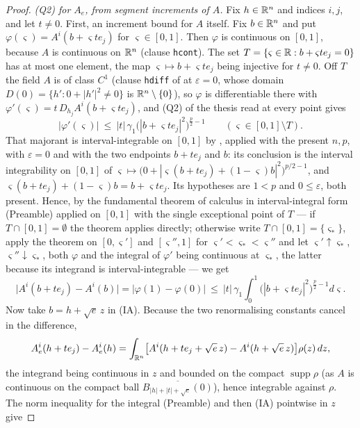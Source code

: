 \begin{proof}
\emph{\textup{(Q2)} for $A_e$, from segment increments of $A$.}  Fix
$h\in\mathbb{R}^n$ and indices $i,j$, and let $t\ne0$.  First, an increment bound for
$A$ itself.  Fix $b\in\mathbb{R}^n$ and put $\varphi(\varsigma)=A^i(b+\varsigma t e_j)$
for $\varsigma\in[0,1]$.  Then $\varphi$ is continuous on $[0,1]$, because $A$
is continuous on $\mathbb{R}^n$ (clause \texttt{hcont}).  The set
$T=\{\varsigma\in\mathbb{R}:b+\varsigma te_j=0\}$ has at most one element, the map
$\varsigma\mapsto b+\varsigma te_j$ being injective for $t\ne0$.  Off $T$ the
field $A$ is of class $C^1$ (clause \texttt{hdiff} of
 at $\varepsilon=0$, whose domain
$D(0)=\{h':0+|h'|^2\ne0\}$ is $\mathbb{R}^n\setminus\{0\}$), so $\varphi$ is
differentiable there with
$\varphi'(\varsigma)=t\,D_{h_j}A^i(b+\varsigma te_j)$, and (Q2) of the thesis read at
every point gives
\[
|\varphi'(\varsigma)|\ \le\ |t|\,\gamma_1\bigl(|b+\varsigma te_j|^2\bigr)^{\frac p2-1}
\qquad(\varsigma\in[0,1]\setminus T).
\]
That majorant is interval-integrable on $[0,1]$ by
, applied with the present $n,p$, with
$\varepsilon=0$ and with the two endpoints $b+te_j$ and $b$: its conclusion is
the interval integrability on $[0,1]$ of
$\varsigma\mapsto\bigl(0+|\varsigma(b+te_j)+(1-\varsigma)b|^2\bigr)^{p/2-1}$,
and $\varsigma(b+te_j)+(1-\varsigma)b=b+\varsigma te_j$.  Its hypotheses are
$1<p$ and $0\le\varepsilon$, both present.  Hence, by the fundamental theorem of
calculus in interval-integral form (Preamble) applied on $[0,1]$ with the single
exceptional point of $T$ --- if $T\cap[0,1]=\emptyset$ the theorem applies
directly; otherwise write $T\cap[0,1]=\{\varsigma_\ast\}$, apply the theorem on
$[0,\varsigma']$ and $[\varsigma'',1]$ for
$\varsigma'<\varsigma_\ast<\varsigma''$ and let
$\varsigma'\uparrow\varsigma_\ast$, $\varsigma''\downarrow\varsigma_\ast$, both
$\varphi$ and the integral of $\varphi'$ being continuous at $\varsigma_\ast$,
the latter because its integrand is interval-integrable --- we get
\[
\bigl|A^i(b+te_j)-A^i(b)\bigr|
=\bigl|\varphi(1)-\varphi(0)\bigr|
\ \le\ |t|\,\gamma_1\int_0^1\bigl(|b+\varsigma te_j|^2\bigr)^{\frac p2-1}d\varsigma .
\tag{IA}
\]
Now take $b=h+\sqrt e\,z$ in (IA).  Because the two renormalising constants
cancel in the difference,
\[
A_e^i(h+te_j)-A_e^i(h)
=\int_{\mathbb{R}^n}\bigl[A^i(h+te_j+\sqrt e\,z)-A^i(h+\sqrt e\,z)\bigr]\rho(z)\,dz ,
\]
the integrand being continuous in $z$ and bounded on the compact
$\operatorname{supp}\rho$ (as $A$ is continuous on the compact ball
$\overline{B_{|h|+|t|+\sqrt e}(0)}$), hence integrable against $\rho$.  The norm
inequality for the integral (Preamble) and then (IA) pointwise in $z$ give

\end{proof}
